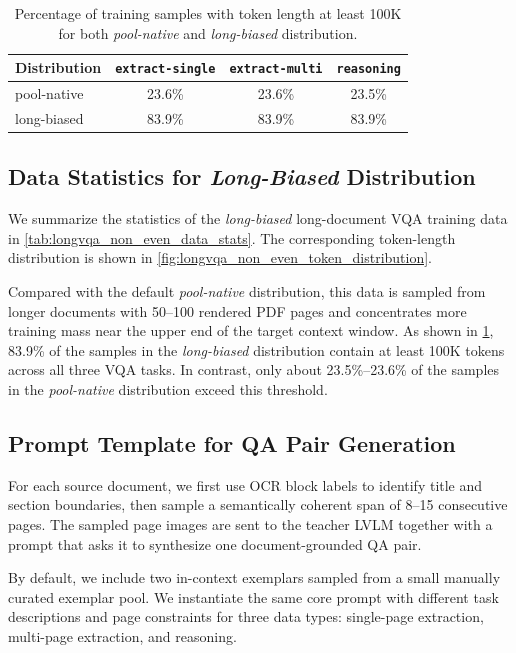 \documentclass{llmxive}
\providecommand{\emph}[1]{\textit{#1}}
\providecommand{\extractsingle}{\texttt{extract-single}\xspace}
\providecommand{\extractmulti}{\texttt{extract-multi}\xspace}
\providecommand{\reasoningtask}{\texttt{reasoning}\xspace}
\begin{document}
{{{\begin{table}[t]
 \centering
 \small
 \setlength{\tabcolsep}{8pt}
 \begin{tabular}{lccc}
 \toprule
 \textbf{Distribution} & \textbf{\extractsingle} & \textbf{\extractmulti} & \textbf{\reasoningtask} \\
 \midrule
 pool-native & 23.6\% & 23.6\% & 23.5\% \\
 long-biased & 83.9\% & 83.9\% & 83.9\% \\
 \bottomrule
 \end{tabular}
\caption{Percentage of training samples with token length at least 100K for both \emph{pool-native} and \emph{long-biased} distribution.}
\label{tab:over_100k_ratio}
\end{table}

\subsection{Data Statistics for \emph{Long-Biased} Distribution}
\label{app:long_document_vqa_details:data_stats_long_only}
We summarize the statistics of the \emph{long-biased} long-document VQA training data in \cref{tab:longvqa_non_even_data_stats}.
The corresponding token-length distribution is shown in \cref{fig:longvqa_non_even_token_distribution}.

Compared with the default \emph{pool-native} distribution, this data is sampled from longer documents with 50--100 rendered PDF pages and concentrates more training mass near the upper end of the target context window.
As shown in \cref{tab:over_100k_ratio}, 83.9\% of the samples in the \emph{long-biased} distribution contain at least 100K tokens across all three VQA tasks.
In contrast, only about 23.5\%--23.6\% of the samples in the \emph{pool-native} distribution exceed this threshold.

\subsection{Prompt Template for QA Pair Generation}
\label{app:long_document_vqa_details:prompt}
For each source document, we first use OCR block labels to identify title and section boundaries, then sample a semantically coherent span of 8--15 consecutive pages.
The sampled page images are sent to the teacher LVLM together with a prompt that asks it to synthesize one document-grounded QA pair.

By default, we include two in-context exemplars sampled from a small manually curated exemplar pool.
We instantiate the same core prompt with different task descriptions and page constraints for three data types: single-page extraction, multi-page extraction, and reasoning.

}}}
\end{document}
